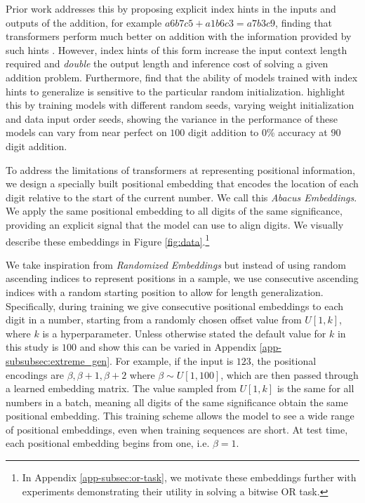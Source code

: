 \documentclass{article}
\begin{document}
Prior work addresses this by proposing explicit index hints in the inputs and outputs of the addition, for example $a6b7c5+a1b6c3=a7b3c9$, finding that transformers perform much better on addition with the information provided by such hints \citep{zhou2023algorithms, zhou2024transformers}.
However, index hints of this form increase the input context length required and \textit{double} the output length and inference cost of solving a given addition problem. 
Furthermore, \citet{zhou2024transformers} find that the ability of models trained with index hints to generalize is sensitive to the particular random initialization.
\citet{zhou2024transformers} highlight this by training models with different random seeds, varying weight initialization and data input order seeds, showing the variance in the performance of these models can vary from near perfect on \(100\) digit addition to \(0\)\% accuracy at \(90\) digit addition.

To address the limitations of transformers at representing positional information, we design a specially built positional embedding that encodes the location of each digit relative to the start of the current number.  We call this \textit{Abacus Embeddings}. We apply the same positional embedding to all digits of the same significance,  providing an explicit signal that the model can use to align digits. 
We visually describe these embeddings in Figure \ref{fig:data}.\footnote{In Appendix \ref{app-subsec:or-task}, we motivate these embeddings further with experiments demonstrating their utility in solving a bitwise OR task.}

We take inspiration from \textit{Randomized Embeddings} \citep{ruoss2023randomized} but instead of using random ascending indices to represent positions in a sample, we use consecutive ascending indices with a random starting position to allow for length generalization.
Specifically, during training we give consecutive positional embeddings to each digit in a number, starting from a randomly chosen offset value from \(U[1,k]\), where \(k\) is a hyperparameter.
Unless otherwise stated the default value for $k$ in this study is $100$ and show this can be varied in Appendix \ref{app-subsubsec:extreme_gen}.
For example, if the input is \(123\), the positional encodings are \(\beta,\beta+1,\beta+2\) where \(\beta \sim U[1,100]\), which are then passed through a learned embedding matrix.
The value sampled from \(U[1,k]\) is the same for all numbers in a batch, meaning all digits of the same significance obtain the same positional embedding. This training scheme allows the model to see a wide range of positional embeddings, even when training sequences are short. 
At test time, each positional embedding begins from one, i.e. \(\beta = 1\).
\end{document}
